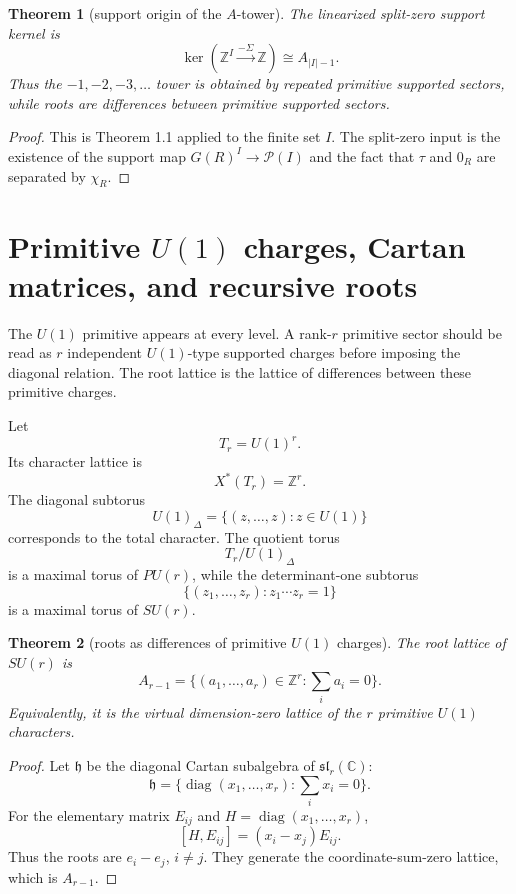 \documentclass[11pt]{article}
\newtheorem{theorem}{Theorem}[section]
\theoremstyle{remark}
\DeclareMathOperator{\diag}{diag}
\newcommand{\ZZ}{\mathbb Z}
\newcommand{\CC}{\mathbb C}
\begin{document}
\begin{theorem}[support origin of the $A$-tower]
The linearized split-zero support kernel is
\[
        \ker\left(\ZZ^I\xrightarrow{-\Sigma}\ZZ\right)
        \cong A_{|I|-1}.
\]
Thus the $-1,-2,-3,\ldots$ tower is obtained by repeated primitive supported sectors, while roots are differences between primitive supported sectors.
\end{theorem}

\begin{proof}
This is Theorem 1.1 applied to the finite set $I$.  The split-zero input is the existence of the support map $G(R)^I\to\mathcal P(I)$ and the fact that $\tau$ and $0_R$ are separated by $\chi_R$.\end{proof}

\section{Primitive $U(1)$ charges, Cartan matrices, and recursive roots}

The $U(1)$ primitive appears at every level.  A rank-$r$ primitive sector should be read as $r$ independent $U(1)$-type supported charges before imposing the diagonal relation.  The root lattice is the lattice of differences between these primitive charges.

Let
\[
        T_r=U(1)^r.
\]
Its character lattice is
\[
        X^*(T_r)=\ZZ^r.
\]
The diagonal subtorus
\[
        U(1)_\Delta=\{(z,\ldots,z):z\in U(1)\}
\]
corresponds to the total character.  The quotient torus
\[
        T_r/U(1)_\Delta
\]
is a maximal torus of $PU(r)$, while the determinant-one subtorus
\[
        \{(z_1,\ldots,z_r):z_1\cdots z_r=1\}
\]
is a maximal torus of $SU(r)$.

\begin{theorem}[roots as differences of primitive $U(1)$ charges]
The root lattice of $SU(r)$ is
\[
        A_{r-1}=\{(a_1,\ldots,a_r)\in\ZZ^r: \sum_i a_i=0\}.
\]
Equivalently, it is the virtual dimension-zero lattice of the $r$ primitive $U(1)$ characters.
\end{theorem}

\begin{proof}
Let $\mathfrak h$ be the diagonal Cartan subalgebra of $\mathfrak{sl}_r(\CC)$:
\[
        \mathfrak h=\{\diag(x_1,\ldots,x_r):\sum_i x_i=0\}.
\]
For the elementary matrix $E_{ij}$ and $H=\diag(x_1,\ldots,x_r)$,
\[
        [H,E_{ij}]=(x_i-x_j)E_{ij}.
\]
Thus the roots are $e_i-e_j$, $i\ne j$.  They generate the coordinate-sum-zero lattice, which is $A_{r-1}$.\end{proof}
\end{document}
